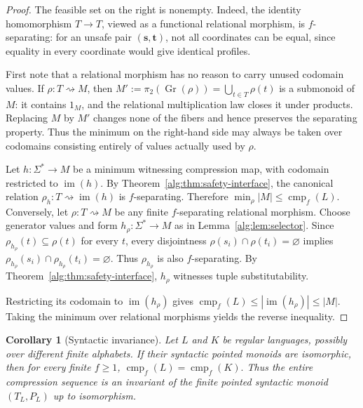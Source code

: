 \documentclass[10pt,a4paper]{article}
\newtheorem{corollary}[theorem]{Corollary}
\theoremstyle{definition}
\theoremstyle{remark}
\newcommand{\cmp}{\operatorname{cmp}}
\newcommand{\relto}{\mathrel{\rightsquigarrow}}
\begin{document}
\begin{proof}
The feasible set on the right is nonempty.  Indeed, the identity homomorphism
\(T\to T\), viewed as a functional relational morphism, is \(f\)-separating:
for an unsafe pair \((\mathbf s,\mathbf t)\), not all coordinates can be equal,
since equality in every coordinate would give identical profiles.

First note that a relational morphism has no reason to carry unused codomain
values.  If \(\rho:T\relto M\), then
\(M':=\pi_2(\operatorname{Gr}(\rho))=\bigcup_{t\in T}\rho(t)\) is a
submonoid of \(M\): it contains \(1_M\), and the relational multiplication
law closes it under products.  Replacing \(M\) by \(M'\) changes none of the
fibers and hence preserves the separating property.  Thus the minimum on the
right-hand side may always be taken over codomains consisting entirely of
values actually used by \(\rho\).

Let \(h:\Sigma^*\to M\) be a minimum witnessing compression map, with codomain
restricted to \(\operatorname{im}(h)\).
By Theorem~\ref{alg:thm:safety-interface}, the canonical relation
\(\rho_h:T\relto\operatorname{im}(h)\)
is \(f\)-separating. Therefore
\(\min_{\rho}|M| \le \cmp_f(L).\)
Conversely, let \(\rho:T\relto M\) be any finite \(f\)-separating relational morphism.
Choose generator values and form \(h_\rho:\Sigma^*\to M\) as in Lemma~\ref{alg:lem:selector}.
Since
\(\rho_{h_\rho}(t)\subseteq\rho(t)\)
for every \(t\), every disjointness
\(\rho(s_i)\cap\rho(t_i)=\varnothing\)
implies
\(\rho_{h_\rho}(s_i)\cap\rho_{h_\rho}(t_i)=\varnothing.\)
Thus \(\rho_{h_\rho}\) is also \(f\)-separating.
By Theorem~\ref{alg:thm:safety-interface},
\(h_\rho\) witnesses tuple substitutability.

Restricting its codomain to
\(\operatorname{im}(h_\rho)\) gives \(\cmp_f(L) \le |\operatorname{im}(h_\rho)| \le |M|.\) Taking the minimum over relational morphisms yields the reverse inequality.
\end{proof}

\begin{corollary}[Syntactic invariance]
\label{alg:cor:syntactic-invariance}
Let \(L\) and \(K\) be regular languages, possibly over different finite
alphabets.  If their syntactic pointed monoids are isomorphic, then for every
finite \(f\ge1\),
\(\cmp_f(L)=\cmp_f(K).\)
Thus the entire compression sequence is an invariant of the finite pointed
syntactic monoid \((T_L,P_L)\) up to isomorphism.
\end{corollary}
\end{document}

